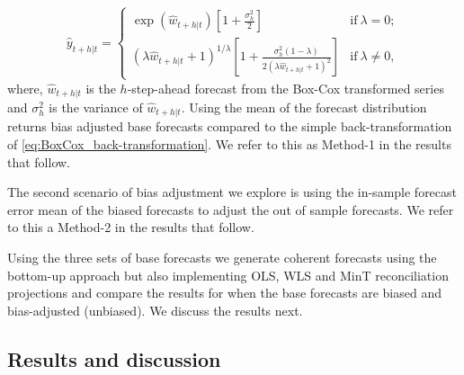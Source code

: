 \documentclass[12pt]{article}
\theoremstyle{definition}
\theoremstyle{property}
\begin{document}
\begin{equation} \label{eq:BoxCox_BT_biasadj}
	 \hat{y}_{t+h|t} =
	\begin{cases}
	\exp({\hat{w}_{t+h|t}})[1+\frac{\sigma_h^2}{2}] & \text{if}~\lambda = 0; \\
	(\lambda \hat{w}_{t+h|t} + 1)^{1/\lambda}[1 + \frac{\sigma_h^2(1-\lambda)}{2(\lambda \hat{w}_{t+h|t} + 1)^2}]       & \text{if}~\lambda \ne 0,
	\end{cases}
	\end{equation}
where, $\hat{w}_{t+h|t}$ is the $h$-step-ahead forecast from the Box-Cox transformed series and $\sigma_h^2$ is the variance of $\hat{w}_{t+h|t}$. Using the mean of the forecast distribution returns bias adjusted base forecasts compared to the simple back-transformation of \eqref{eq:BoxCox_back-transformation}. We refer to this as Method-1 in the results that follow.

The second scenario of bias adjustment we explore is using the in-sample forecast error mean of the biased forecasts to adjust the out of sample forecasts. We refer to this a Method-2 in the results that follow.
	
Using the three sets of base forecasts we generate coherent forecasts using the bottom-up approach but also implementing OLS, WLS and MinT reconciliation projections and compare the results for when the base forecasts are biased and bias-adjusted (unbiased). We discuss the results next. 

\subsection{Results and discussion}


\end{document}
